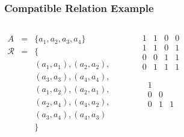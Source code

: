 \documentclass[dvipsnames]{beamer}
\begin{document}
\begin{frame}
  \frametitle{Compatible Relation Example}

  \begin{example}
    \begin{columns}
      \begin{eqnarray*}
        A           & = & \{a_1,a_2,a_3,a_4\}\\
        \mathcal{R} & = & \{\\
                    &   & (a_1,a_1),(a_2,a_2),\\
                    &   & (a_3,a_3),(a_4,a_4),\\
                    &   & (a_1,a_2),(a_2,a_1),\\
                    &   & (a_2,a_4),(a_4,a_2),\\
                    &   & (a_3,a_4),(a_4,a_3)\\
                    &   & \}
      \end{eqnarray*}

      \begin{center}

        \bigskip
      \end{center}

      \pause
      \begin{center}
        \[ \begin{array}{|cccc|}
            1  &  1  &  0  &  0\\
            1  &  1  &  0  &  1\\
            0  &  0  &  1  &  1\\
            0  &  1  &  1  &  1
          \end{array} \]

        \[ \begin{array}{|ccc|}
            1  &     & \\
            0  &  0  & \\
            0  &  1  &  1
          \end{array} \]
      \end{center}
    \end{columns}
  \end{example}
\end{frame}
\end{document}
